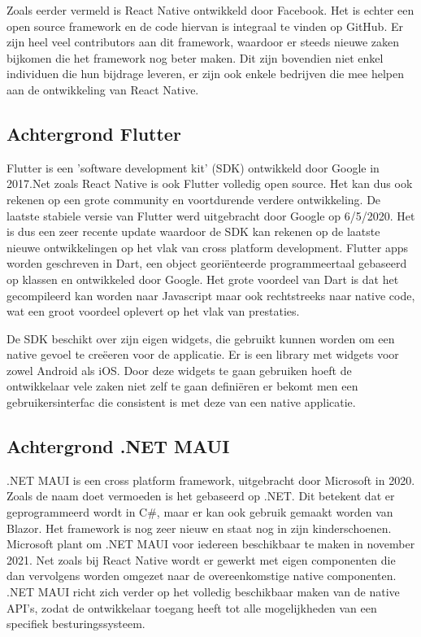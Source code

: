 Zoals eerder vermeld is React Native ontwikkeld door Facebook. Het is echter een open source framework en de code hiervan is integraal te vinden op GitHub. Er zijn heel veel contributors aan dit framework, waardoor er steeds nieuwe zaken bijkomen die het framework nog beter maken. Dit zijn bovendien niet enkel individuen die hun bijdrage leveren, er zijn ook enkele bedrijven die mee helpen aan de ontwikkeling van React Native.

\subsection{Achtergrond Flutter}

Flutter is een 'software development kit' (SDK) ontwikkeld door Google in 2017.Net zoals React Native is ook Flutter volledig open source. Het kan dus ook rekenen op een grote community en voortdurende verdere ontwikkeling. De laatste stabiele versie van Flutter werd uitgebracht door Google op 6/5/2020. Het is dus een zeer recente update waardoor de SDK kan rekenen op de laatste nieuwe ontwikkelingen op het vlak van cross platform development. Flutter apps worden geschreven in Dart, een object georiënteerde programmeertaal gebaseerd op klassen en ontwikkeled door Google. Het grote voordeel van Dart is dat het gecompileerd kan worden naar Javascript maar ook rechtstreeks naar native code, wat een groot voordeel oplevert op het vlak van prestaties. 

De SDK beschikt over zijn eigen widgets, die gebruikt kunnen worden om een native gevoel te creëeren voor de applicatie. Er is een library met widgets voor zowel Android als iOS. Door deze widgets te gaan gebruiken hoeft de ontwikkelaar vele zaken niet zelf te gaan definiëren er bekomt men een gebruikersinterfac die consistent is met deze van een native applicatie. 

\subsection{Achtergrond .NET MAUI}

.NET MAUI is een cross platform framework, uitgebracht door Microsoft in 2020. Zoals de naam doet vermoeden is het gebaseerd op .NET. Dit betekent dat er geprogrammeerd wordt in C\#, maar er kan ook gebruik gemaakt worden van Blazor. Het framework is nog zeer nieuw en staat nog in zijn kinderschoenen. Microsoft plant om .NET MAUI voor iedereen beschikbaar te maken in november 2021. Net zoals bij React Native wordt er gewerkt met eigen componenten die dan vervolgens worden omgezet naar de overeenkomstige native componenten. .NET MAUI richt zich verder op het volledig beschikbaar maken van de native API's, zodat de ontwikkelaar toegang heeft tot alle mogelijkheden van een specifiek besturingssysteem. 

